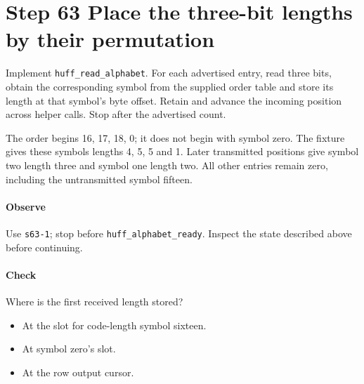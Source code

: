 \section{Step 63 Place the three-bit lengths by their permutation}\label{png-huff-s63}
Implement \texttt{huff\_read\_alphabet}. For each advertised entry, read three bits, obtain the corresponding symbol from the supplied order table and store its length at that symbol's byte offset. Retain and advance the incoming position across helper calls. Stop after the advertised count.

The order begins 16, 17, 18, 0; it does not begin with symbol zero. The fixture gives these symbols lengths 4, 5, 5 and 1. Later transmitted positions give symbol two length three and symbol one length two. All other entries remain zero, including the untransmitted symbol fifteen.

\paragraph{Observe} Use \texttt{s63-1}; stop before \texttt{huff\_alphabet\_ready}. Inspect the state described above before continuing.

\paragraph{Check} Where is the first received length stored?
\begin{itemize}
\item[A.] At the slot for code-length symbol sixteen.
\item[B.] At symbol zero’s slot.
\item[C.] At the row output cursor.
\end{itemize}
